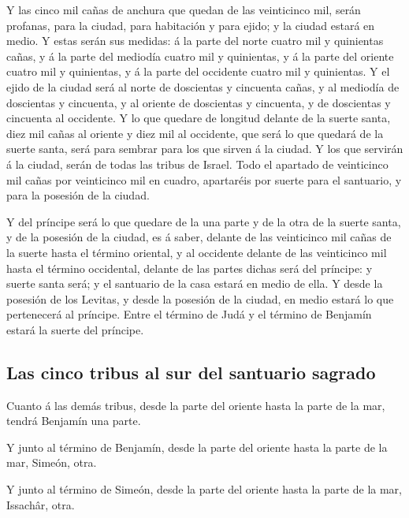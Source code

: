 Y las cinco mil cañas de anchura que quedan de las
veinticinco mil, serán profanas, para la ciudad, para habitación y para
ejido; y la ciudad estará en medio.  Y estas serán sus
medidas: á la parte del norte cuatro mil y quinientas cañas, y á la
parte del mediodía cuatro mil y quinientas, y á la parte del oriente
cuatro mil y quinientas, y á la parte del occidente cuatro mil y
quinientas.  Y el ejido de la ciudad será al norte de
doscientas y cincuenta cañas, y al mediodía de doscientas y cincuenta, y
al oriente de doscientas y cincuenta, y de doscientas y cincuenta al
occidente.  Y lo que quedare de longitud delante de la
suerte santa, diez mil cañas al oriente y diez mil al occidente, que
será lo que quedará de la suerte santa, será para sembrar para los que
sirven á la ciudad.  Y los que servirán á la ciudad,
serán de todas las tribus de Israel.  Todo el apartado de
veinticinco mil cañas por veinticinco mil en cuadro, apartaréis por
suerte para el santuario, y para la posesión de la ciudad.

 Y del príncipe será lo que quedare de la una parte y de
la otra de la suerte santa, y de la posesión de la ciudad, es á saber,
delante de las veinticinco mil cañas de la suerte hasta el término
oriental, y al occidente delante de las veinticinco mil hasta el término
occidental, delante de las partes dichas será del príncipe: y suerte
santa será; y el santuario de la casa estará en medio de ella.
 Y desde la posesión de los Levitas, y desde la posesión
de la ciudad, en medio estará lo que pertenecerá al príncipe. Entre el
término de Judá y el término de Benjamín estará la suerte del príncipe.

\hypertarget{las-cinco-tribus-al-sur-del-santuario-sagrado}{%
\subsection{Las cinco tribus al sur del santuario
sagrado}\label{las-cinco-tribus-al-sur-del-santuario-sagrado}}

 Cuanto á las demás tribus, desde la parte del oriente
hasta la parte de la mar, tendrá Benjamín una parte.

 Y junto al término de Benjamín, desde la parte del
oriente hasta la parte de la mar, Simeón, otra.

 Y junto al término de Simeón, desde la parte del oriente
hasta la parte de la mar, Issachâr, otra.

